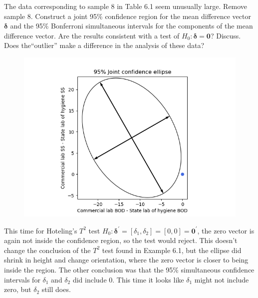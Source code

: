 The data corresponding to sample 8 in Table 6.1 seem unusually large. Remove sample 8.
Construct a joint 95\% confidence region for the mean difference vector $\bm{\delta}$ and the 95\%
Bonferroni simultaneous intervals for the components of the mean difference vector.
Are the results consistent with a test of $H_{0}: \bm{\delta} = \textbf{0}$? Discuss. Does the``outlier'' make a
difference in the analysis of these data?

\begin{figure}[H]
    \centering
    \includegraphics[scale=0.70]{./python/chapter-6/Question-6-3.png}
\end{figure}

This time for Hoteling's $T^{2}$ test $H_{0}: \bm{\delta}^{\prime} = [\delta_{1}, \delta_{2}] = [0, 0] = \textbf{0}^{\prime}$, the zero vector is again not inside the confidence region, so the test would reject.
This doesn't change the conclusion of the $T^{2}$ test found in Example 6.1, but the ellipse did shrink in height and change orientation, where the zero vector is closer to being inside the region.
The other conclusion was that the 95\% simultaneous confidence intervals for $\delta_{1}$ and $\delta_{2}$ did include 0.
This time it looks like $\delta_{1}$ might not include zero, but $\delta_{2}$ still does.

